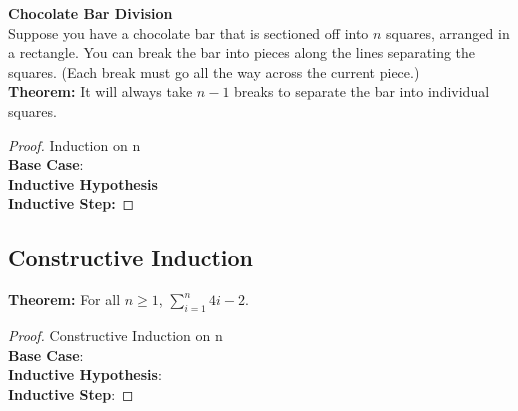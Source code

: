 \begin{example}
	\textbf{Chocolate Bar Division}\\
	Suppose you have a chocolate bar that is sectioned off into $n$ squares, arranged in a rectangle. You can break the bar into pieces along the lines separating the squares. (Each break must go all the way across the current piece.)\\	\textbf{Theorem:} It will always take $n-1$ breaks to separate the bar into individual squares.
\end{example}

\begin{proof}
	Induction on n\\
	\textbf{Base Case}:\\
	\textbf{Inductive Hypothesis}\\
	\textbf{Inductive Step:}
\end{proof}

\subsection{Constructive Induction}

\begin{example}
	\textbf{Theorem:} For all $n \geq 1$, $\sum_{i=1}^n4i-2$.
\end{example}

\begin{proof}
	Constructive Induction on n\\
	\textbf{Base Case}:\\
	\textbf{Inductive Hypothesis}:\\
	\textbf{Inductive Step}:
\end{proof}
	
